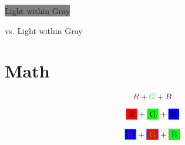 \documentclass{article}
\begin{document}
\colorbox{gray}{\textcolor{light}{Light within Gray}}

vs. \colorbox[gray]{0.5}{\textcolor{light}{Light within Gray}}



{}
\section{Math}
\[ \textcolor{red}{R} + \textcolor{green}{G} + \textcolor{blue}{B} \]

\[ \colorbox{red}{R} + \colorbox{green}{G} + \colorbox{blue}{B} \]

\[ \fcolorbox{green}{blue}{\textcolor{red}{R}} + \fcolorbox{blue}{red}{\textcolor{green}{G}} + \fcolorbox{red}{green}{\textcolor{blue}{B}} \]
\end{document}
